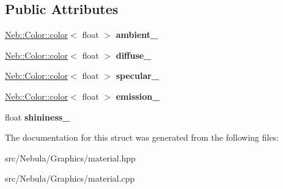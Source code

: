 \subsection*{\-Public \-Attributes}
\begin{DoxyCompactItemize}
\item 
\hypertarget{structNeb_1_1material_1_1raw_ac89b7d0fbb78c1b32cce884ccc02ee7c}{\hyperlink{classNeb_1_1Color_1_1color}{\-Neb\-::\-Color\-::color}$<$ float $>$ {\bfseries ambient\-\_\-}}\label{structNeb_1_1material_1_1raw_ac89b7d0fbb78c1b32cce884ccc02ee7c}

\item 
\hypertarget{structNeb_1_1material_1_1raw_a89affeb24a5f68aed606b9a10a9200da}{\hyperlink{classNeb_1_1Color_1_1color}{\-Neb\-::\-Color\-::color}$<$ float $>$ {\bfseries diffuse\-\_\-}}\label{structNeb_1_1material_1_1raw_a89affeb24a5f68aed606b9a10a9200da}

\item 
\hypertarget{structNeb_1_1material_1_1raw_a5c95594cfb7b0d09b7e9451f44b73148}{\hyperlink{classNeb_1_1Color_1_1color}{\-Neb\-::\-Color\-::color}$<$ float $>$ {\bfseries specular\-\_\-}}\label{structNeb_1_1material_1_1raw_a5c95594cfb7b0d09b7e9451f44b73148}

\item 
\hypertarget{structNeb_1_1material_1_1raw_a5b5e60a7d67b5eca9f553ba3d017f1e7}{\hyperlink{classNeb_1_1Color_1_1color}{\-Neb\-::\-Color\-::color}$<$ float $>$ {\bfseries emission\-\_\-}}\label{structNeb_1_1material_1_1raw_a5b5e60a7d67b5eca9f553ba3d017f1e7}

\item 
\hypertarget{structNeb_1_1material_1_1raw_ada9810b67306db0c24bdfcc0b08d500a}{float {\bfseries shininess\-\_\-}}\label{structNeb_1_1material_1_1raw_ada9810b67306db0c24bdfcc0b08d500a}

\end{DoxyCompactItemize}


\-The documentation for this struct was generated from the following files\-:\begin{DoxyCompactItemize}
\item 
src/\-Nebula/\-Graphics/material.\-hpp\item 
src/\-Nebula/\-Graphics/material.\-cpp\end{DoxyCompactItemize}
